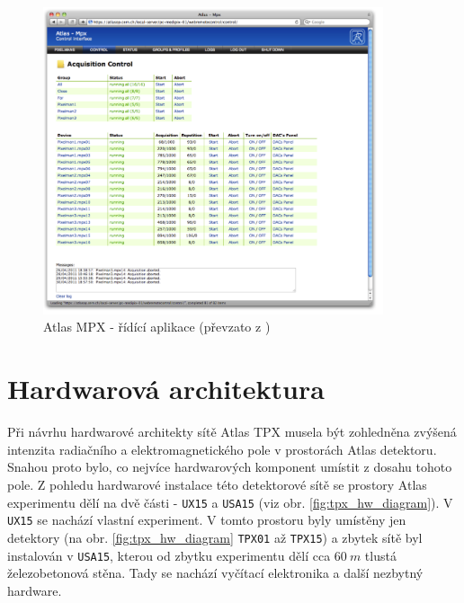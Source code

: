 \begin{figure}[ht]
	\begin{center}
		\includegraphics[width=10cm]{figures/mpx_web.png}
		\caption{Atlas MPX - řídící aplikace (převzato z \cite{TurecekThesis2011})}
		\label{fig:mpx_web}
	\end{center}
\end{figure}

\section{Hardwarová architektura}\label{atlas:hw_arch}
Při návrhu hardwarové architekty sítě Atlas TPX musela být zohledněna zvýšená intenzita radiačního a elektromagnetického pole v prostorách Atlas detektoru. Snahou proto bylo, co nejvíce hardwarových komponent umístit z dosahu tohoto pole. Z pohledu hardwarové instalace této detektorové sítě se prostory Atlas experimentu dělí na dvě části - \texttt{UX15} a \texttt{USA15} (viz obr. \ref{fig:tpx_hw_diagram}). V \texttt{UX15} se nachází vlastní experiment. V tomto prostoru byly umístěny jen detektory (na obr. \ref{fig:tpx_hw_diagram} \texttt{TPX01} až \texttt{TPX15}) a zbytek sítě byl instalován v \texttt{USA15}, kterou od zbytku experimentu dělí cca $60~m$ tlustá železobetonová stěna. Tady se nachází vyčítací elektronika a další nezbytný hardware.

